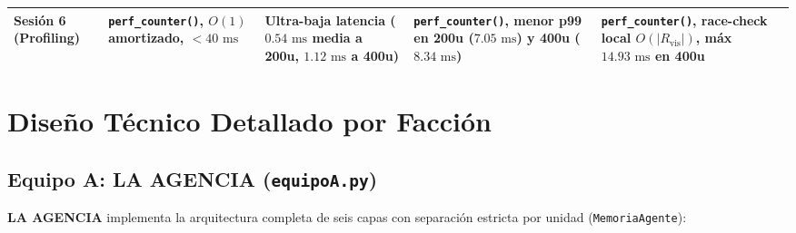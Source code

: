 \documentclass[10pt,a4paper]{article}
\begin{document}
\begin{table}[H]
\begin{tabularx}{\textwidth}{>{\bfseries}l X X X X}
Sesión 6 (Profiling) & \texttt{perf\_counter()}, $O(1)$ amortizado, $<40\text{ ms}$ & Ultra-baja latencia ($0.54\text{ ms}$ media a 200u, $1.12\text{ ms}$ a 400u) & \texttt{perf\_counter()}, menor p99 en 200u ($7.05\text{ ms}$) y 400u ($8.34\text{ ms}$) & \texttt{perf\_counter()}, race-check local $O(|R_{\text{vis}}|)$, máx $14.93\text{ ms}$ en 400u \\
\bottomrule
\end{tabularx}
\end{table}

\section{Diseño Técnico Detallado por Facción}

\subsection{Equipo A: LA AGENCIA (\texttt{equipoA.py})}
\textbf{LA AGENCIA} implementa la arquitectura completa de seis capas con separación estricta por unidad (\texttt{MemoriaAgente}):
\end{document}
